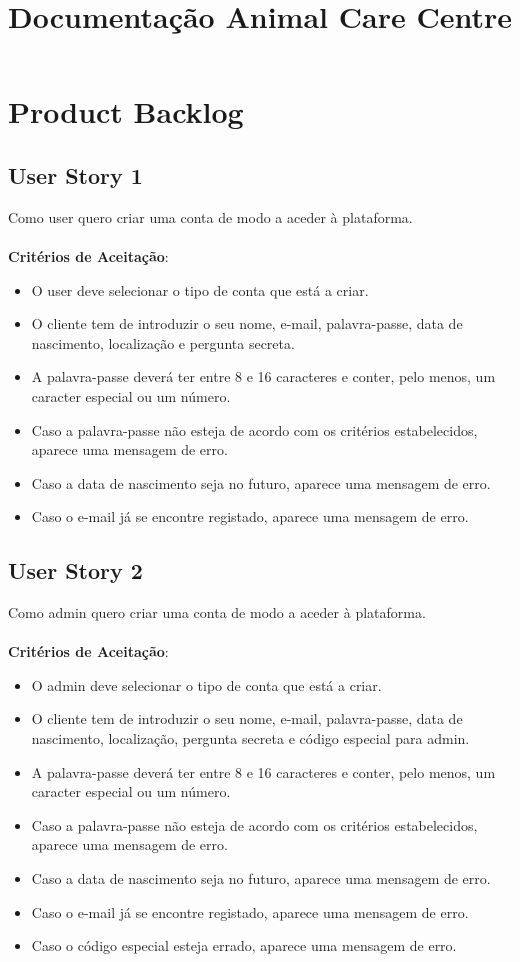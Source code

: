 \documentclass[a4paper,11pt]{article}
\title{Documentação Animal Care Centre}
\author{}
\date{}
\begin{document}
\maketitle
\vspace{-67pt}

\section{Product Backlog}
\subsection{User Story 1}
Como user quero criar uma conta de modo a aceder à plataforma.\\\\
\textbf{Critérios de Aceitação}:
\begin{itemize}
  \item O user deve selecionar o tipo de conta que está a criar.
  \item O cliente tem de introduzir o seu nome, e-mail, palavra-passe, data de nascimento, localização e pergunta secreta.
  \item A palavra-passe deverá ter entre 8 e 16 caracteres e conter, pelo menos, um caracter especial ou um número.
  \item Caso a palavra-passe não esteja de acordo com os critérios estabelecidos, aparece uma mensagem de erro.
  \item Caso a data de nascimento seja no futuro, aparece uma mensagem de erro.
  \item Caso o e-mail já se encontre registado, aparece uma mensagem de erro.
\end{itemize}

\subsection{User Story 2}
Como admin quero criar uma conta de modo a aceder à plataforma.\\\\
\textbf{Critérios de Aceitação}:
\begin{itemize}
  \item O admin deve selecionar o tipo de conta que está a criar.
  \item O cliente tem de introduzir o seu nome, e-mail, palavra-passe, data de nascimento, localização, pergunta secreta e código especial para admin.
  \item A palavra-passe deverá ter entre 8 e 16 caracteres e conter, pelo menos, um caracter especial ou um número.
  \item Caso a palavra-passe não esteja de acordo com os critérios estabelecidos, aparece uma mensagem de erro.
  \item Caso a data de nascimento seja no futuro, aparece uma mensagem de erro.
  \item Caso o e-mail já se encontre registado, aparece uma mensagem de erro.
  \item Caso o código especial esteja errado, aparece uma mensagem de erro.
\end{itemize}
\end{document}
